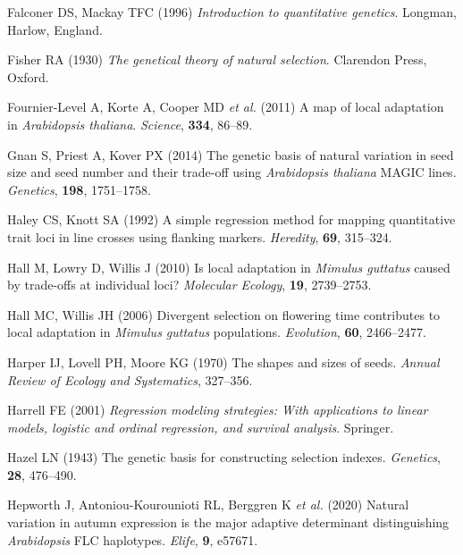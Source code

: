 \documentclass[
]{article}
\begin{document}
\leavevmode\hypertarget{ref-Falconer1996}{}%
Falconer DS, Mackay TFC (1996) \emph{Introduction to quantitative genetics}. Longman, Harlow, England.

\leavevmode\hypertarget{ref-Fisher1930}{}%
Fisher RA (1930) \emph{The genetical theory of natural selection}. Clarendon Press, Oxford.

\leavevmode\hypertarget{ref-fournier2011map}{}%
Fournier-Level A, Korte A, Cooper MD \emph{et al.} (2011) A map of local adaptation in \emph{Arabidopsis thaliana}. \emph{Science}, \textbf{334}, 86--89.

\leavevmode\hypertarget{ref-gnan2014genetic}{}%
Gnan S, Priest A, Kover PX (2014) The genetic basis of natural variation in seed size and seed number and their trade-off using \emph{Arabidopsis thaliana} MAGIC lines. \emph{Genetics}, \textbf{198}, 1751--1758.

\leavevmode\hypertarget{ref-Haley1992}{}%
Haley CS, Knott SA (1992) A simple regression method for mapping quantitative trait loci in line crosses using flanking markers. \emph{Heredity}, \textbf{69}, 315--324.

\leavevmode\hypertarget{ref-Hall2010}{}%
Hall M, Lowry D, Willis J (2010) Is local adaptation in \emph{Mimulus guttatus} caused by trade-offs at individual loci? \emph{Molecular Ecology}, \textbf{19}, 2739--2753.

\leavevmode\hypertarget{ref-Hall2006}{}%
Hall MC, Willis JH (2006) Divergent selection on flowering time contributes to local adaptation in \emph{Mimulus guttatus} populations. \emph{Evolution}, \textbf{60}, 2466--2477.

\leavevmode\hypertarget{ref-Harper1970}{}%
Harper IJ, Lovell PH, Moore KG (1970) The shapes and sizes of seeds. \emph{Annual Review of Ecology and Systematics}, 327--356.

\leavevmode\hypertarget{ref-harrell2001regression}{}%
Harrell FE (2001) \emph{Regression modeling strategies: With applications to linear models, logistic and ordinal regression, and survival analysis}. Springer.

\leavevmode\hypertarget{ref-Hazel1943}{}%
Hazel LN (1943) The genetic basis for constructing selection indexes. \emph{Genetics}, \textbf{28}, 476--490.

\leavevmode\hypertarget{ref-hepworth2020natural}{}%
Hepworth J, Antoniou-Kourounioti RL, Berggren K \emph{et al.} (2020) Natural variation in autumn expression is the major adaptive determinant distinguishing \emph{Arabidopsis} FLC haplotypes. \emph{Elife}, \textbf{9}, e57671.
\end{document}
